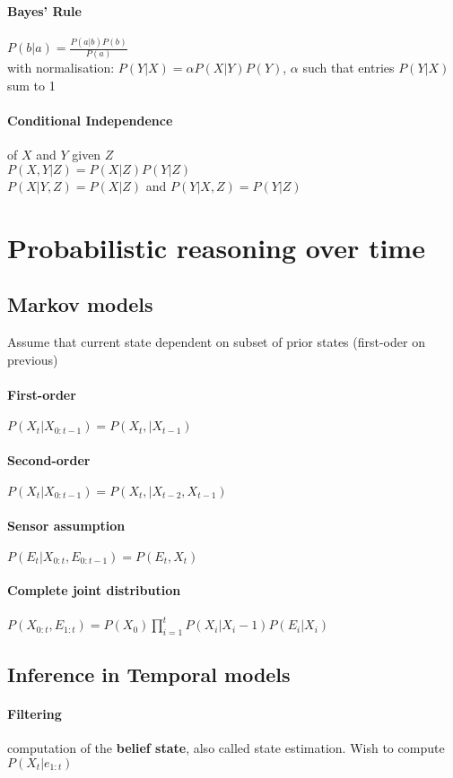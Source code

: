 \begin{multicols}{4}
\paragraph{Bayes' Rule} $P(b|a) = \frac{P(a|b)P(b)}{P(a)}$ \\
with normalisation: $P(Y|X) = \alpha P(X|Y)P(Y)$, $\alpha$ such that entries $P(Y|X)$ sum to 1

\paragraph{Conditional Independence} of $X$ and $Y$ given $Z$\\
$P(X,Y|Z) = P(X|Z) P(Y|Z)$\\
$P(X|Y,Z) = P(X|Z)$ and $P(Y|X,Z) = P(Y|Z)$

\section{Probabilistic reasoning over time}

\subsection{Markov models}
Assume that current state dependent on subset of prior states (first-oder on previous)
\paragraph{First-order} $P(X_t|X_{0:t-1}) = P(X_t,|X_{t-1})$
\paragraph{Second-order} $P(X_t|X_{0:t-1}) = P(X_t,|X_{t-2},X_{t-1})$
\paragraph{Sensor assumption} $P(E_t|X_{0:t},E_{0:t-1}) = P(E_t, X_t)$
\paragraph{Complete joint distribution}
$P(X_{0:t},E_{1:t}) = P(X_0) \prod\limits_{i=1}^t P(X_i|X_i-1)P(E_i|X_i)$
\subsection{Inference in Temporal models}
\paragraph{Filtering} computation of the \textbf{belief state}, also called state estimation. Wish to compute $P(X_t|e_{1:t})$

\end{multicols}
